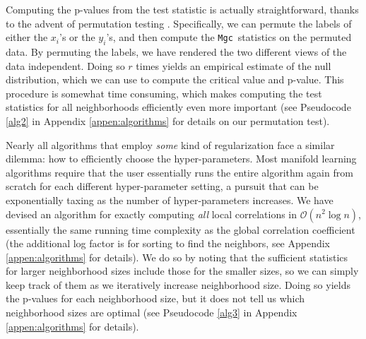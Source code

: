 \documentclass[11pt]{article}
\newcommand{\note}[2][]{\added[#1,remark={#2}]{}}
\providecommand{\sct}[1]{{\sc \texttt{#1}}}
\providecommand{\mc}[1]{\mathcal{#1}}
\newcommand{\Mgc}{\sct{Mgc}}
\newcommand{\cs}[1]{{\note{cs: #1}}}
\begin{document}
Computing the p-values from the test statistic is actually straightforward, thanks to the advent of permutation testing \cite{Good2005}.  Specifically, we can permute the labels of either the $x_i$'s or the $y_i$'s, and then compute the \Mgc~statistics on the permuted data.  By permuting the labels, we have rendered the two different views of the data independent.  Doing so $r$ times yields an empirical estimate of the null distribution, which we can use to compute the critical value and p-value. This procedure is somewhat time consuming, which makes computing the test statistics for all neighborhoods efficiently even more important (see Pseudocode \ref{alg2} in Appendix \ref{appen:algorithms} for details on our permutation test).


Nearly all algorithms that employ \emph{some} kind of regularization face a similar dilemma: how to efficiently choose the hyper-parameters. 
Most  manifold learning algorithms require that the user essentially runs the entire algorithm again from scratch for each different hyper-parameter setting, a pursuit that can be exponentially taxing as the number of hyper-parameters increases.
We have devised an algorithm for exactly computing \emph{all} local correlations in $\mc{O}(n^2 \log n)$, essentially the same running time complexity as the global correlation coefficient (the additional log factor is for sorting to find the neighbors, see Appendix \ref{appen:algorithms} for details).  
We do so by noting that the sufficient statistics for larger neighborhood sizes include those for the smaller sizes, so we can simply keep track of them as we iteratively increase neighborhood size. Doing so yields the p-values for each neighborhood size, but it does not tell us which neighborhood sizes are optimal (see Pseudocode \ref{alg3} in Appendix \ref{appen:algorithms} for details).
\cs{seemed redundant: which allows our definition of local correlations to be an efficient and general tool in data analysis.}
\end{document}
